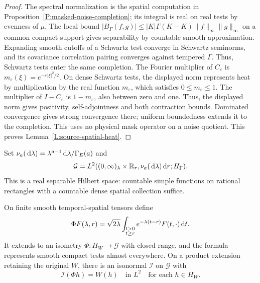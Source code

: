 \begin{proof}
  The spectral normalization is the spatial computation in
  Proposition~\ref{P:masked-noise-completion}; its integral is real on real
  tests by evenness of $\mu$. The local bound $|B_\Gamma(f,g)| \le
  |K|\Gamma(K-K)\|f\|_\infty\|g\|_\infty$ on a common compact support gives
  separability by countable smooth approximation. Expanding smooth cutoffs of a
  Schwartz test converge in Schwartz seminorms, and its covariance correlation
  pairing converges against tempered $\Gamma$. Thus, Schwartz tests enter the
  same completion. The Fourier multiplier of $C_\varepsilon$ is
  $m_\varepsilon(\xi) = e^{-\varepsilon|\xi|^2/2}$. On dense Schwartz tests, the
  displayed norm represents heat by multiplication by the real function
  $m_\varepsilon$, which satisfies $0 \le m_\varepsilon \le 1$. The multiplier
  of $I-C_\varepsilon$ is $1-m_\varepsilon$, also between zero and one. Thus,
  the
  displayed norm gives positivity, self-adjointness and both contraction bounds.
  Dominated convergence gives strong convergence there; uniform boundedness
  extends it to the completion. This uses no physical mask operator on a noise
  quotient. This proves Lemma~\ref{L:source-spatial-heat}.
\end{proof}

Set $\nu_a(\,\mathrm{d}\lambda) = \lambda^{a-1}\,\mathrm{d}\lambda/\Gamma_E(a)$ and
\[
  \mathcal{G}=L^2((0,\infty)_\lambda\times\mathbb{R}_r,
  \nu_a(\,\mathrm{d}\lambda)\,\mathrm{d} r;H_\Gamma).
\]
This is a real separable Hilbert space: countable simple functions on rational
rectangles with a countable dense spatial collection suffice.

\begin{lemma}\label{L:source-retaining-isometry}
  On finite smooth temporal-spatial tensors define
  \begin{equation}\label{E:source-feature-isometry}
    \Phi F(\lambda,r)=\sqrt{2\lambda}
    \int_{\substack{t>0\\t\ge r}}e^{-\lambda(t-r)}F(t,\cdot)\,\mathrm{d} t.
  \end{equation}
  It extends to an isometry $\Phi:H_W \to \mathcal{G}$ with closed range, and
  the formula represents smooth compact tests almost everywhere. On a product
  extension retaining the original $W$, there is an isonormal $\mathcal{I}$ on
  $\mathcal{G}$ with
  \begin{equation}\label{E:source-given-W-retention}
    \mathcal{I}(\Phi h)=W(h)\quad\text{in }L^2
    \quad\text{for each }h\in H_W.
  \end{equation}
\end{lemma}

